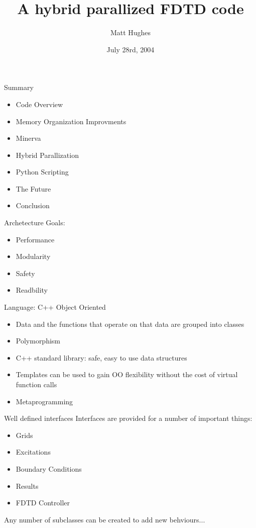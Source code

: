 \documentclass[pdf, nototal, slideBW]{prosper}
\title{A hybrid parallized FDTD code}
\author{Matt Hughes}
\date{July 28rd, 2004}
\begin{document}
\maketitle

\begin{slide}{Summary}

  \begin{itemize}
    \item Code Overview
    \item Memory Organization Improvments
    \item Minerva
    \item Hybrid Parallization
    \item Python Scripting
    \item The Future
    \item Conclusion
  \end{itemize}

\end{slide}

\begin{slide}{Archetecture}
  Goals:
  \begin{itemize}
  \item Performance
  \item Modularity
  \item Safety
  \item Readbility
  \end{itemize}

\end{slide}

\begin{slide}{Language: C++}
  Object Oriented 
  \begin{itemize}
  \item Data and the functions that operate on that data are
    grouped into classes
  \item Polymorphism
  \item C++ standard library: safe, easy to use data structures
  \item Templates can be used to gain OO flexibility without the cost
    of virtual function calls
  \item Metaprogramming
  \end{itemize}  

\end{slide}

\begin{slide}{Well defined interfaces}
  Interfaces are provided for a number of important things:
  \begin{itemize}
  \item Grids
  \item Excitations
  \item Boundary Conditions
  \item Results
  \item FDTD Controller 
  \end{itemize}
  
  Any number of subclasses can be created to add new behviours...
\end{slide}
\end{document}
